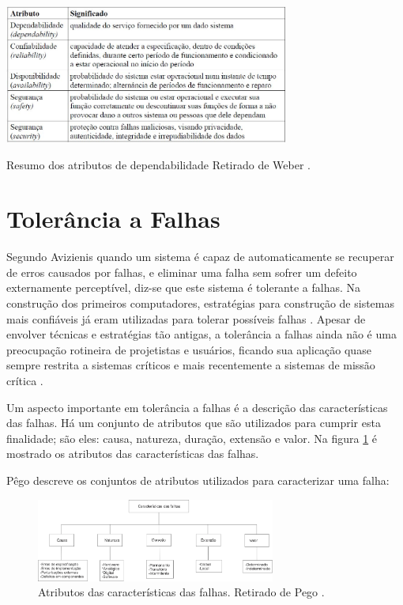 \begin{table}[h]
	\centering
	\includegraphics[width=0.7\textwidth]{figuras/tabelaDenpendabilidade.jpg}
	\caption[Resumo dos Atributos de Denpendabilidade]{Resumo dos atributos de dependabilidade Retirado de Weber \cite{Weber:2002}.}
	\label{Img:atDenp}	
\end{table}



\section{Tolerância a Falhas} \label{sec:tolerancia}

Segundo Avizienis \cite{Avizienis:1984} quando um sistema é capaz de automaticamente se recuperar de erros causados por falhas, e eliminar uma falha sem sofrer um defeito externamente perceptível, diz-se que este sistema é tolerante a falhas. Na construção dos primeiros computadores, estratégias para construção de sistemas mais confiáveis já eram utilizadas para tolerar possíveis falhas \cite{VonNewmann:1956}. Apesar de envolver técnicas e estratégias tão antigas, a tolerância a falhas ainda não é uma preocupação rotineira de projetistas e usuários, ficando sua aplicação quase sempre restrita a sistemas críticos e mais recentemente a sistemas de missão crítica \cite{Weber:2002}.

Um aspecto importante em tolerância a falhas é a descrição das características das falhas. Há um conjunto de atributos que são utilizados para cumprir esta finalidade; são eles: causa, natureza, duração, extensão e valor. Na figura \ref{Img:falhasCaracteristicas} é mostrado os atributos das características das falhas.

Pêgo \cite{Pego:2014} descreve os conjuntos de atributos utilizados para caracterizar uma falha:

\begin{figure}[H]
	\centering
	\includegraphics[width=0.7\textwidth]{figuras/falhasCaracteristicas.jpg}
	\caption[Características das Falhas]{Atributos das características das falhas. Retirado de Pego \cite{Pego:2014}.}
	\label{Img:falhasCaracteristicas}	
\end{figure}


